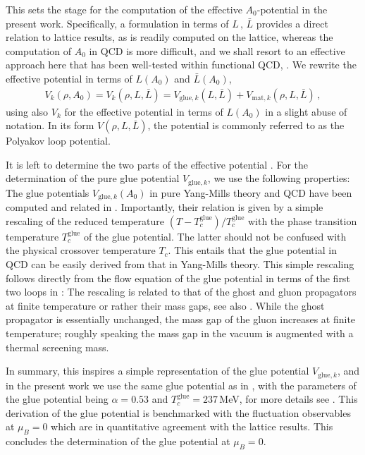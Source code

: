 \documentclass[reprint,twocolumn,superscriptaddress,preprintnumbers,amsmath,amssymb,aps,prd,floatfix]{revtex4-2}
\begin{document}
This sets the stage for the computation of the effective $A_0$-potential in the present work. Specifically, a formulation in terms of $L\,,\,\bar L$ provides a direct relation to lattice results, as  is readily computed on the lattice, whereas the computation of $A_0$ in QCD is more difficult, and we shall resort to an effective approach here that has been well-tested within functional QCD, \cite{Haas:2013qwp}. We rewrite the effective potential in terms of $L(A_0)$ and $\bar L(A_0)$, 
%
\begin{align} 
    V_k(\rho,A_0) = V_k(\rho,L,\bar L) =V_{\mathrm{glue},k}(L,\bar L)+V_{\mathrm{mat},k}(\rho,L,\bar L) \,, 
\label{eq:PolpotLbarL}
\end{align} 
%
using also $V_k$ for the effective potential in terms of $L(A_0)$ in a slight abuse of notation. In its form $V(\rho,L,\bar L)$, the potential is commonly referred to as the Polyakov loop potential. 

It is left to determine the two parts of the effective potential . For the determination of the pure glue potential $V_{\mathrm{glue},k}$, we use the following properties: The glue potentials $V_{\mathrm{glue},k}(A_0)$ in pure Yang-Mills theory and QCD have been computed and related in \cite{Braun:2007bx, Braun:2009gm, Fister:2013bh, Haas:2013qwp}. Importantly, their relation is given by a simple rescaling of the reduced temperature $(T-T_c^\mathrm{glue})/T_c^\mathrm{glue}$ with the phase transition temperature $T_c^\mathrm{glue}$ of the glue potential. The latter should not be confused with the physical crossover temperature $T_c$. This entails that the glue potential in QCD can be easily derived from that in Yang-Mills theory. This simple rescaling follows directly from the flow equation of the glue potential in terms of the first two loops in : The rescaling is related to that of the ghost and gluon propagators at finite temperature or rather their mass gaps, see also  \cite{Fu:2019hdw}. While the ghost propagator is essentially unchanged, the mass gap of the gluon increases at finite temperature; roughly speaking the mass gap in the vacuum is augmented with a thermal screening mass.

In summary, this inspires a simple representation of the glue potential $V_{\mathrm{glue},k}$, and in the present work we use the same glue potential as in \cite{Fu:2021oaw}, with the parameters of the glue potential being $\alpha=0.53$ and $T_c^\mathrm{glue} =237$\,MeV, for more details see \cite{Fu:2021oaw}. This derivation of the glue potential is benchmarked with the fluctuation observables at $\mu_B=0$ which are in quantitative agreement with the lattice results. This concludes the determination of the glue potential at $\mu_B=0$.
\end{document}
